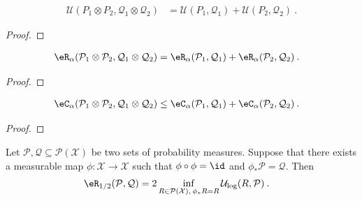 \begin{lemma}\label{lem:maxUtility_prod}
  \leanok
\begin{align*}
  \mathcal{U}(P_1 \otimes P_2, \mathcal{Q}_1 \otimes \mathcal{Q}_2)
  &= \mathcal{U}(P_1, \mathcal{Q}_1) + \mathcal{U}(P_2, \mathcal{Q}_2)
  \: .
\end{align*}
\end{lemma}

\begin{proof}\leanok

\end{proof}


\begin{lemma}\label{lem:erenyiDiv_prod}
  \leanok
\begin{align*}
  \eR_\alpha(\mathcal{P}_1 \otimes \mathcal{P}_2, \mathcal{Q}_1 \otimes \mathcal{Q}_2)
  &= \eR_\alpha(\mathcal{P}_1, \mathcal{Q}_1) + \eR_\alpha(\mathcal{P}_2, \mathcal{Q}_2)
  \: .
\end{align*}
\end{lemma}

\begin{proof}\leanok

\end{proof}


\begin{lemma}\label{lem:echernoffDiv_prod_le}
  \leanok
\begin{align*}
  \eC_\alpha(\mathcal{P}_1 \otimes \mathcal{P}_2, \mathcal{Q}_1 \otimes \mathcal{Q}_2)
  &\le \eC_\alpha(\mathcal{P}_1, \mathcal{Q}_1) + \eC_\alpha(\mathcal{P}_2, \mathcal{Q}_2)
  \: .
\end{align*}
\end{lemma}

\begin{proof}\leanok

\end{proof}


\begin{lemma}\label{lem:erenyiDiv_map_swap}
  \leanok
Let $\mathcal{P},\mathcal{Q} \subseteq \mathcal{P}(\mathcal{X})$ be two sets of probability measures.
Suppose that there exists a measurable map $\phi : \mathcal{X} \to \mathcal{X}$ such that $\phi \circ \phi = \id$ and $\phi_* \mathcal{P} = \mathcal{Q}$.
Then
\begin{align*}
  \eR_{1/2}(\mathcal{P}, \mathcal{Q})
  &= 2 \inf_{R \in \mathcal{P}(\mathcal{X}), \: \phi_* R = R} \mathcal{U}_{\log}(R, \mathcal{P})
  \: .
\end{align*}
\end{lemma}

